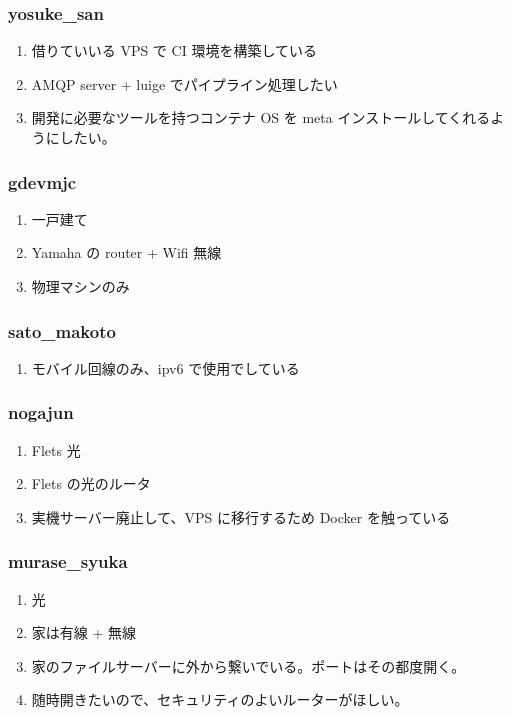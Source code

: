 \documentclass[cjk,dvipdfmx,10pt,compress,%
hyperref={bookmarks=true,bookmarksnumbered=true,bookmarksopen=false,%
colorlinks=false,%
pdftitle={第 132 回 関西 Debian 勉強会},%
pdfauthor={かわだ},%
pdfsubject={資料},%
}]{beamer}
\begin{document}
\begin{frame}
  \frametitle{ yosuke\_san }
  \begin{enumerate}
  \item 借りていいる VPS で CI 環境を構築している
  \item AMQP server + luige でパイプライン処理したい
  \item 開発に必要なツールを持つコンテナ OS を meta インストールしてくれるようにしたい。
  \end{enumerate}
\end{frame}

\begin{frame}
  \frametitle{gdevmjc}
  \begin{enumerate}
  \item  一戸建て
  \item Yamaha の router + Wifi 無線
  \item 物理マシンのみ
  \end{enumerate}
\end{frame}

\begin{frame}
  \frametitle{sato\_makoto}
  \begin{enumerate}
  \item モバイル回線のみ、ipv6 で使用でしている
  \end{enumerate}
\end{frame}

\begin{frame}
  \frametitle{nogajun}
  \begin{enumerate}
  \item Flets 光 
  \item Flets の光のルータ
  \item 実機サーバー廃止して、VPS に移行するため Docker を触っている
  \end{enumerate}
\end{frame}

\begin{frame}
  \frametitle{murase\_syuka}
  \begin{enumerate}
  \item 光 
  \item 家は有線 + 無線 
  \item 家のファイルサーバーに外から繋いでいる。ポートはその都度開く。
  \item 随時開きたいので、セキュリティのよいルーターがほしい。
  \end{enumerate}
\end{frame}
\end{document}
